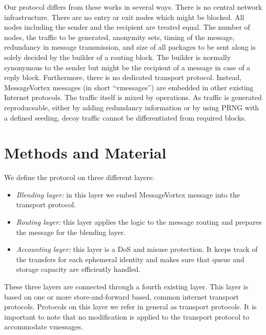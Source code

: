\documentclass[9pt,journal,compsoc]{IEEEtran}
\begin{document}
Our protocol differs from these works in several ways. There is no central network infrastructure. There are no entry or exit nodes which might be blocked. All nodes including the sender and the recipient are treated equal. The number of nodes, the traffic to be generated, anonymity sets, timing of the message, redundancy in message transmission, and size of all packages to be sent along is solely decided by the builder of a routing block. The builder is normally synonymous to the sender but might be the recipient of a message in case of a reply block. Furthermore, there is no dedicated transport protocol. Instead, MessageVortex messages  (in short ``vmessages'') are embedded in other existing Internet protocols. The traffic itself is mixed by operations. As traffic is generated reproduceable, either by adding redundancy information or by using PRNG with a defined seeding, decoy traffic cannot be differentiated from required blocks.

\section{Methods and Material}

We define the protocol on three different layers:
\begin{itemize}
	\item \emph{Blending layer:} in this layer we embed MessageVortex message into the transport protocol. 
	\item \emph{Routing layer:} this layer applies the logic to the message routing and prepares the message for the blending layer.
	\item \emph{Accounting layer:} this layer is a DoS and misuse protection. It keeps track of the transfers for each ephemeral identity and makes sure that queue and storage capacity are efficiently handled.     
\end{itemize}
These three layers are connected through a fourth existing layer. This layer is based on one or more store-and-forward based, common internet transport protocols. Protocols on this layer we refer in general as transport protocols. It is important to note that no modification is applied to the transport protocol to accommodate vmessages.
\end{document}
